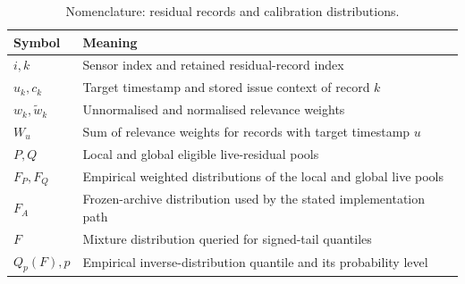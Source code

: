 \documentclass[pdflatex,sn-mathphys-num]{sn-jnl}
\begin{document}
\begin{table}[!htbp]
\caption{Nomenclature: residual records and calibration distributions.}\label{tab:notation-calibration}
\centering\setlength{\tabcolsep}{3pt}\small
\begin{tabular}{>{\raggedright\arraybackslash}p{}>{\raggedright\arraybackslash}p{}}\toprule
Symbol & Meaning \\\midrule
$i,k$ & Sensor index and retained residual-record index \\
$u_k,c_k$ & Target timestamp and stored issue context of record $k$ \\
$w_k,\widetilde w_k$ & Unnormalised and normalised relevance weights \\
$W_u$ & Sum of relevance weights for records with target timestamp $u$ \\
$P,Q$ & Local and global eligible live-residual pools \\
$F_P,F_Q$ & Empirical weighted distributions of the local and global live pools \\
$F_A$ & Frozen-archive distribution used by the stated implementation path \\
$F$ & Mixture distribution queried for signed-tail quantiles \\
$Q_p(F),p$ & Empirical inverse-distribution quantile and its probability level \\
\bottomrule\end{tabular}
\end{table}
\FloatBarrier
\end{document}

